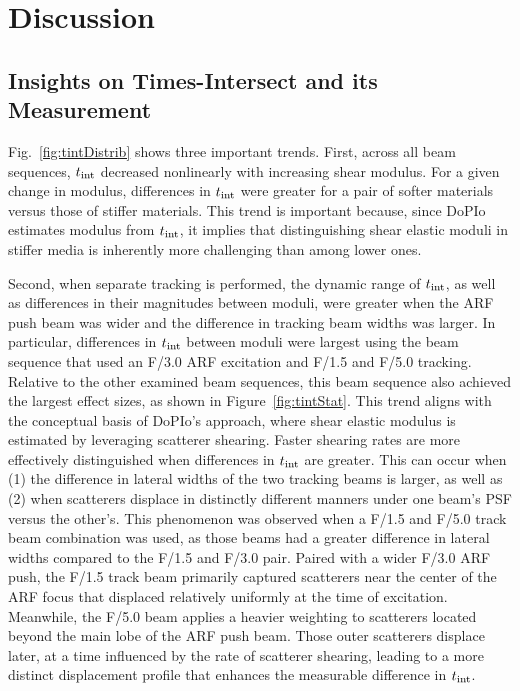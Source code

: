 \section{Discussion}
\label{sec:discussion}

\subsection{Insights on Times-Intersect and its Measurement}

Fig.~\ref{fig:tintDistrib} shows three important trends. First, across all beam sequences, $t_{\textnormal{int}}$ decreased nonlinearly with increasing shear modulus. For a given change in modulus, differences in $t_{\textnormal{int}}$ were greater for a pair of softer materials versus those of stiffer materials. This trend is important because, since DoPIo estimates modulus from $t_{\textnormal{int}}$, it implies that distinguishing shear elastic moduli in stiffer media is inherently more challenging than among lower ones.

Second, when separate tracking is performed, the dynamic range of $t_{\textnormal{int}}$, as well as differences in their magnitudes between moduli, were greater when the ARF push beam was wider and the difference in tracking beam widths was larger. In particular, differences in $t_{\textnormal{int}}$ between moduli were largest using the beam sequence that used an F/3.0 ARF excitation and F/1.5 and F/5.0 tracking. Relative to the other examined beam sequences, this beam sequence also achieved the largest effect sizes, as shown in Figure~\ref{fig:tintStat}. This trend aligns with the conceptual basis of DoPIo's approach, where shear elastic modulus is estimated by leveraging scatterer shearing. Faster shearing rates are more effectively distinguished when differences in $t_{\textnormal{int}}$ are greater. This can occur when (1) the difference in lateral widths of the two tracking beams is larger, as well as (2) when scatterers displace in distinctly different manners under one beam's PSF versus the other's. This phenomenon was observed when a F/1.5 and F/5.0 track beam combination was used, as those beams had a greater difference in lateral widths compared to the F/1.5 and F/3.0 pair. Paired with a wider F/3.0 ARF push, the F/1.5 track beam primarily captured scatterers near the center of the ARF focus that displaced relatively uniformly at the time of excitation. Meanwhile, the F/5.0 beam applies a heavier weighting to scatterers located beyond the main lobe of the ARF push beam. Those outer scatterers displace later, at a time influenced by the rate of scatterer shearing, leading to a more distinct displacement profile that enhances the measurable difference in $t_{\textnormal{int}}$.


